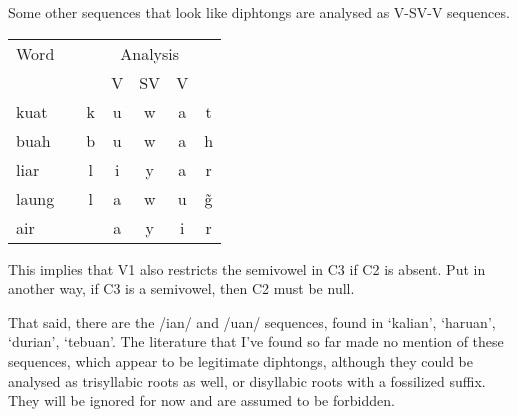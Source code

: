 \documentclass{article}
\begin{document}
Some other sequences that look like diphtongs are analysed as V-SV-V sequences.

\begin{center}
    \begin{tabular}{l c c c c c c}
        \toprule
        Word  & \hspace{2em} & \multicolumn{5}{c}{Analysis} \\
              &              &   & V & SV & V &             \\ \midrule
        kuat  &              & k & u & w  & a & t           \\
        buah  &              & b & u & w  & a & h           \\
        liar  &              & l & i & y  & a & r           \\
        laung &              & l & a & w  & u & \~g         \\
        air   &              &   & a & y  & i & r           \\ \bottomrule
    \end{tabular}
\end{center}

This implies that V1 also restricts the semivowel in C3 if C2 is absent. Put in another way, if C3 is a semivowel, then C2 must be null. %

That said, there are the /ian/ and /uan/ sequences, found in `kalian', `haruan', `durian', `tebuan'. The literature that I've found so far made no mention of these sequences, which appear to be legitimate diphtongs, although they could be analysed as trisyllabic roots as well, or disyllabic roots with a fossilized suffix. They will be ignored for now and are assumed to be forbidden.


%
%
%
%
\end{document}

